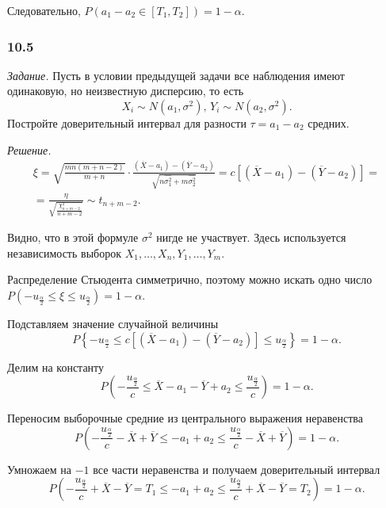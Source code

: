 Следовательно, $P \left( a_1 - a_2 \in \left[ T_1, T_2 \right] \right) = 1 - \alpha $.

\subsubsection*{10.5}

\textit{Задание.}
Пусть в условии предыдущей задачи все наблюдения имеют одинаковую, но неизвестную дисперсию,
то есть
$$X_i \sim N \left( a_1, \sigma^2 \right), \,
  Y_i \sim N \left( a_2, \sigma^2 \right).$$
Постройте доверительный интервал для разности $ \tau = a_1 - a_2$ средних.

\textit{Решение.}
\begin{equation*}
  \begin{split}
    \xi =
    \sqrt{ \frac{mn \left( m + n - 2 \right) }{m + n}} \cdot
    \frac{ \left( \overline{X} - a_1 \right) - \left( \overline{Y} - a_2 \right) }{ \sqrt{n \hat{ \sigma_1^2} + m \hat{ \sigma_2^2}}} =
    c \left[ \left( \overline{X} - a_1 \right) - \left( \overline{Y} - a_2 \right) \right] = \\
    = \frac{ \eta }{ \sqrt{ \frac{ \chi_{n + m - 2}^2}{n + m - 2}}} \sim
    t_{n + m - 2}.
  \end{split}
\end{equation*}

Видно, что в этой формуле $ \sigma^2$ нигде не участвует.
Здесь используется независимость выборок $X_1, \dotsc, X_n, Y_1, \dotsc, Y_m$.

Распределение Стьюдента симметрично,
поэтому можно искать одно число
$P \left( -u_{ \frac{ \alpha }{2}} \leq \xi \leq u_{ \frac{ \alpha }{2}} \right) =
  1 - \alpha $.

Подставляем значение случайной величины
$$P \left\{
    -u_{ \frac{ \alpha }{2}} \leq
    c \left[ \left( \overline{X} - a_1 \right) - \left( \overline{Y} - a_2 \right) \right] \leq
    u_{ \frac{ \alpha }{2}}
  \right\} =
  1 - \alpha.$$

Делим на константу
$$P \left(
    - \frac{u_{ \frac{ \alpha }{2}}}{c} \leq \overline{X} - a_1 - \overline{Y} + a_2 \leq
    \frac{u_{ \frac{ \alpha }{2}}}{c}
  \right) =
  1 - \alpha.$$

Переносим выборочные средние из центрального выражения неравенства
$$P \left(
    - \frac{u_{ \frac{ \alpha }{2}}}{c} - \overline{X} + \overline{Y} \leq - a_1 + a_2 \leq
    \frac{u_{ \frac{ \alpha }{2}}}{c} - \overline{X} + \overline{Y}
  \right) =
  1 - \alpha.$$

Умножаем на $-1$ все части неравенства и получаем доверительный интервал
$$P \left(
    - \frac{u_{ \frac{ \alpha }{2}}}{c} + \overline{X} - \overline{Y} = T_1 \leq - a_1 + a_2 \leq
    \frac{u_{ \frac{ \alpha }{2}}}{c} + \overline{X} - \overline{Y} = T_2
  \right) =
  1 - \alpha.$$

